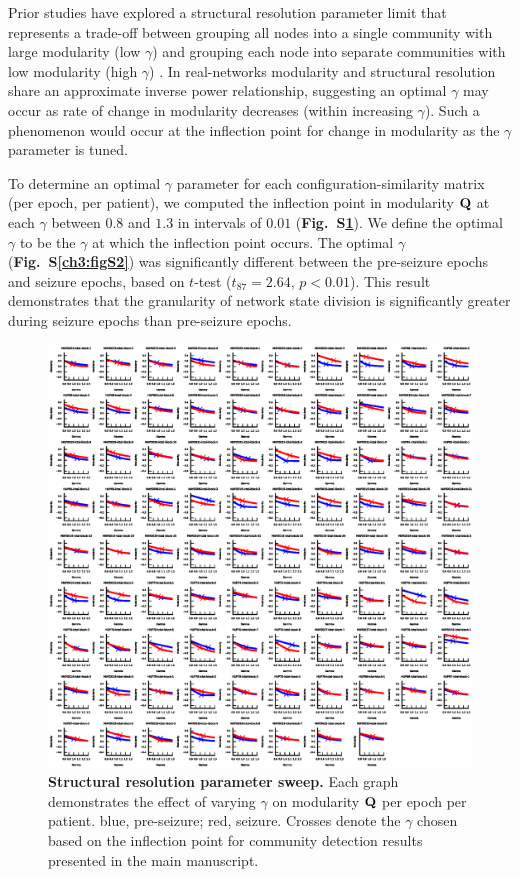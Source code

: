 Prior studies have explored a structural resolution parameter limit that represents a trade-off between grouping all nodes into a single community with large modularity (low $\gamma$) and grouping each node into separate communities with low modularity (high $\gamma$) \cite{fortunato2007resolution}. In real-networks \cite{bassett2013robust} modularity and structural resolution share an approximate inverse power relationship, suggesting an optimal $\gamma$ may occur as rate of change in modularity decreases (within increasing $\gamma$). Such a phenomenon would occur at the inflection point for change in modularity as the $\gamma$ parameter is tuned.

To determine an optimal $\gamma$ parameter for each configuration-similarity matrix (per epoch, per patient), we computed the inflection point in modularity $\mathbf{\displaystyle Q}$ at each $\gamma$ between $0.8$ and $1.3$ in intervals of $0.01$ (\textbf{Fig.~S\ref{ch3:figS1}}). We define the optimal $\gamma$ to be the $\gamma$ at which the inflection point occurs. The optimal $\gamma$ (\textbf{Fig.~S\ref{ch3:figS2}}) was significantly different between the pre-seizure epochs and seizure epochs, based on $t$-test ($t_{87}=2.64$, $p<0.01$). This result demonstrates that the granularity of network state division is significantly greater during seizure epochs than pre-seizure epochs.

\begin{figure}[H]
    \centering
    \includegraphics[width=\textwidth]{gammasweep.eps}
    \caption[Structural resolution parameter sweep for modularity optimization]{\textbf{Structural resolution parameter sweep.} Each graph demonstrates the effect of varying $\gamma$ on modularity $\mathbf{\displaystyle Q}$ per epoch per patient. blue, pre-seizure; red, seizure. Crosses denote the $\gamma$ chosen based on the inflection point for community detection results presented in the main manuscript.\label{ch3:figS1}}
\end{figure}

